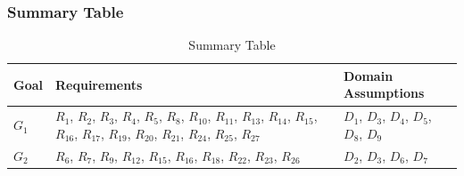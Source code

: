 \subsubsection{Summary Table}
\begin{table}[H]
    \begin{tabular}{|p{1cm}|p{7cm}|p{7cm}|}
        \hline
        \textbf{Goal} & \textbf{Requirements} & \textbf{Domain Assumptions} \\ \hline
        $G_{1}$ & $R_{1}$, $R_{2}$, $R_{3}$, $R_{4}$, $R_{5}$, $R_{8}$, $R_{10}$, $R_{11}$, $R_{13}$, $R_{14}$, $R_{15}$, $R_{16}$, $R_{17}$, $R_{19}$, $R_{20}$, $R_{21}$, $R_{24}$, $R_{25}$, $R_{27}$ & $D_{1}$, $D_{3}$, $D_{4}$, $D_{5}$, $D_{8}$, $D_{9}$ \\ \hline
        $G_{2}$ & $R_{6}$, $R_{7}$, $R_{9}$, $R_{12}$, $R_{15}$, $R_{16}$, $R_{18}$, $R_{22}$, $R_{23}$, $R_{26}$ & $D_{2}$, $D_{3}$, $D_{6}$, $D_{7}$ \\ \hline
    \end{tabular}
    \caption{Summary Table}
\end{table}

